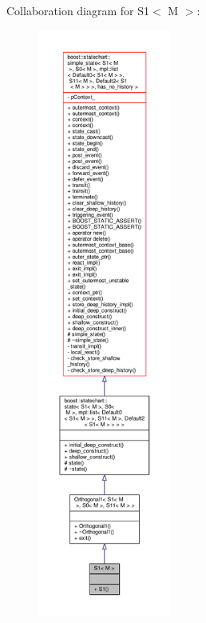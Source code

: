 Collaboration diagram for S1$<$ M $>$\+:
\nopagebreak
\begin{figure}[H]
\begin{center}
\leavevmode
\includegraphics[height=550pt]{struct_s1__coll__graph}
\end{center}
\end{figure}
